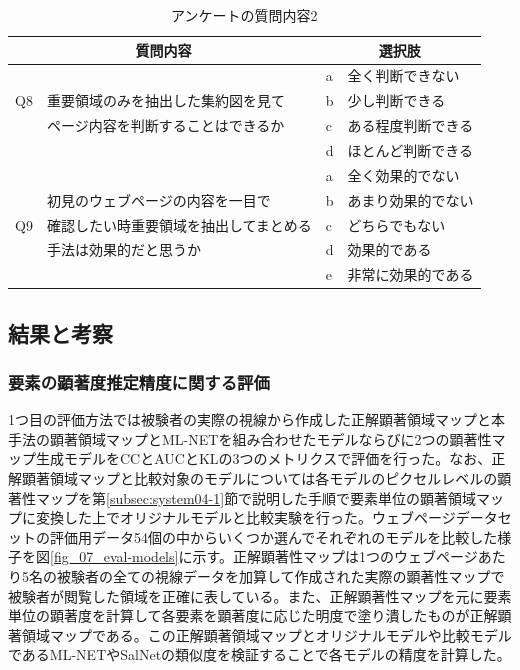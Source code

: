\begin{table}[H]
    \caption{アンケートの質問内容2}
    \label{table:question02}
    \centering
    \begingroup
    \renewcommand{\arraystretch}{1} %
    \small
    \begin{tabular}{|l|l|l|l|}
        \hline
        \multicolumn{2}{|c|}{質問内容} & \multicolumn{2}{|c|}{選択肢} \\ \hline
        & & a & 全く判断できない \\ \cline{3-4}
        Q8 & 重要領域のみを抽出した集約図を見て & b & 少し判断できる \\ \cline{3-4}
        & ページ内容を判断することはできるか & c & ある程度判断できる \\ \cline{3-4}
        & & d & ほとんど判断できる \\ \hline
        & & a & 全く効果的でない \\ \cline{3-4}
        & 初見のウェブページの内容を一目で & b & あまり効果的でない \\ \cline{3-4}
        Q9 & 確認したい時重要領域を抽出してまとめる & c & どちらでもない \\ \cline{3-4}
        & 手法は効果的だと思うか & d & 効果的である \\ \cline{3-4}
        & & e & 非常に効果的である \\ \hline
        \end{tabular}
        \endgroup
\end{table}

\newpage
\subsection{結果と考察}
\subsubsection{要素の顕著度推定精度に関する評価}\label{subsec:evaluation1}
\par 1つ目の評価方法では被験者の実際の視線から作成した正解顕著領域マップと本手法の顕著領域マップとML-NETを組み合わせたモデルならびに2つの顕著性マップ生成モデルをCCとAUCとKLの3つのメトリクスで評価を行った。なお、正解顕著領域マップと比較対象のモデルについては各モデルのピクセルレベルの顕著性マップを第\ref{subsec:system04-1}節で説明した手順で要素単位の顕著領域マップに変換した上でオリジナルモデルと比較実験を行った。ウェブページデータセットの評価用データ54個の中からいくつか選んでそれぞれのモデルを比較した様子を図\ref{fig_07_eval-models}に示す。正解顕著性マップは1つのウェブページあたり5名の被験者の全ての視線データを加算して作成された実際の顕著性マップで被験者が閲覧した領域を正確に表している。また、正解顕著性マップを元に要素単位の顕著度を計算して各要素を顕著度に応じた明度で塗り潰したものが正解顕著領域マップである。この正解顕著領域マップとオリジナルモデルや比較モデルであるML-NETやSalNetの類似度を検証することで各モデルの精度を計算した。

